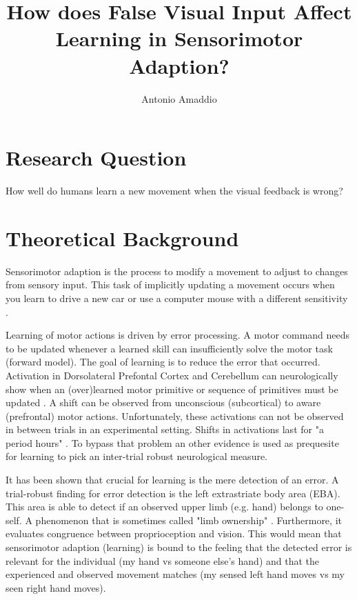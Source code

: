 \documentclass[man]{apa7}
\title{How does False Visual Input Affect Learning in Sensorimotor Adaption?}
\author{Antonio Amaddio}
\affiliation{Freie Universität Berlin \\ Decision Neuroscience, Winter 2022/23, Supervisor: Dr. Rasmus Bruckner}
\begin{document}
\maketitle


\section{Research Question}

How well do humans learn a new movement when the visual feedback is wrong?

\section{Theoretical Background}

Sensorimotor adaption is the process to modify a movement to adjust to changes from sensory input. This task of implicitly updating a movement occurs when you learn to drive a new car or use a computer mouse with a different sensitivity \parencite{seidler2013motor}.

Learning of motor actions is driven by error processing. A motor command needs to be updated whenever a learned skill can insufficiently solve the motor task (forward model). The goal of learning is to reduce the error that occurred. Activation in Dorsolateral Prefontal Cortex and Cerebellum can neurologically show when an (over)learned motor primitive or sequence of primitives must be updated \parencite{seidler2013motor}. A shift can be observed from unconscious (subcortical) to aware (prefrontal) motor actions. Unfortunately, these activations can not be observed in between trials in an experimental setting. Shifts in activations last for "a period hours" \parencite[p. 424]{seidler2013motor}. To bypass that problem an other evidence is used as prequesite for learning to pick an inter-trial robust neurological measure.

It has been shown that crucial for learning is the mere detection of an error. A trial-robust finding for error detection is the left extrastriate body area (EBA). This area is able to detect if an observed upper limb (e.g. hand) belongs to one-self. A phenomenon that is sometimes called "limb ownership" \parencite{Limanowski2016}. Furthermore, it evaluates congruence between proprioception and vision. This would mean that sensorimotor adaption (learning) is bound to the feeling that the detected error is relevant for the individual (my hand vs someone else's hand) and that the experienced and observed movement matches (my sensed left hand moves vs my seen right hand moves).
\end{document}

